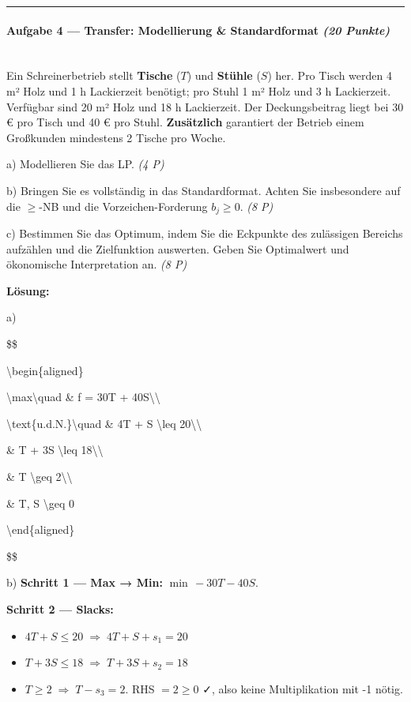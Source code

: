 \documentclass[11pt, a4paper]{article}
\begin{document}
\noindent\textcolor{rulegray}{\rule{\linewidth}{0.4pt}}


\paragraph{Aufgabe 4 — Transfer: Modellierung \& Standardformat \textit{(20 Punkte)}}\mbox{}\\[2pt]

Ein Schreinerbetrieb stellt \textbf{Tische} ($T$) und \textbf{Stühle} ($S$) her. Pro Tisch werden 4 m² Holz und 1 h Lackierzeit benötigt; pro Stuhl 1 m² Holz und 3 h Lackierzeit. Verfügbar sind 20 m² Holz und 18 h Lackierzeit. Der Deckungsbeitrag liegt bei 30 € pro Tisch und 40 € pro Stuhl. \textbf{Zusätzlich} garantiert der Betrieb einem Großkunden mindestens 2 Tische pro Woche.


a) Modellieren Sie das LP. \textit{(4 P)}


b) Bringen Sie es vollständig in das Standardformat. Achten Sie insbesondere auf die $\geq$-NB und die Vorzeichen-Forderung $b_j \geq 0$. \textit{(8 P)}


c) Bestimmen Sie das Optimum, indem Sie die Eckpunkte des zulässigen Bereichs aufzählen und die Zielfunktion auswerten. Geben Sie Optimalwert und ökonomische Interpretation an. \textit{(8 P)}


\textbf{Lösung:}


a)

\$\$

\textbackslash{}begin\{aligned\}

\textbackslash{}max\textbackslash{}quad \& f = 30T + 40S\textbackslash{}\textbackslash{}

\textbackslash{}text\{u.d.N.\}\textbackslash{}quad \& 4T + S \textbackslash{}leq 20\textbackslash{}\textbackslash{}

\& T + 3S \textbackslash{}leq 18\textbackslash{}\textbackslash{}

\& T \textbackslash{}geq 2\textbackslash{}\textbackslash{}

\& T, S \textbackslash{}geq 0

\textbackslash{}end\{aligned\}

\$\$


b) \textbf{Schritt 1 — Max → Min:} $\min\,-30T - 40S$.


\textbf{Schritt 2 — Slacks:}

\begin{itemize}
  \item $4T + S \leq 20 \;\Rightarrow\; 4T + S + s_1 = 20$
  \item $T + 3S \leq 18 \;\Rightarrow\; T + 3S + s_2 = 18$
  \item $T \geq 2 \;\Rightarrow\; T - s_3 = 2$. RHS $= 2 \geq 0$ ✓, also keine Multiplikation mit -1 nötig.
\end{itemize}
\end{document}

